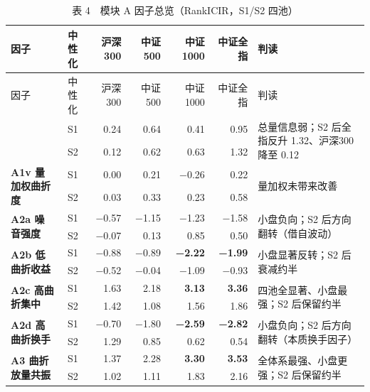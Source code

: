 \documentclass[UTF8,a4paper,zihao=-4,fontset=windows]{ctexart}
\begin{document}
\begin{longtable}{@{}p{3.0cm} c r r r r p{5.2cm}@{}}
\caption{表 4　模块 A 因子总览（RankICIR，S1/S2 四池）}\\
\toprule
因子 & 中性化 & 沪深300 & 中证500 & 中证1000 & 中证全指 & 判读 \\
\midrule
\endfirsthead
\toprule
因子 & 中性化 & 沪深300 & 中证500 & 中证1000 & 中证全指 & 判读 \\
\midrule
\endhead
\bottomrule
\endfoot
\multirow{2}{\hsize}{\textbf{A1 基础曲折度}} & S1 & 0.24 & 0.64 & 0.41 & 0.95 & \multirow{2}{\hsize}{总量信息弱；S2 后全指反升 1.32、沪深300 降至 0.12} \\
 & S2 & 0.12 & 0.62 & 0.63 & 1.32 & \\
\cmidrule(lr){2-6}
\multirow{2}{\hsize}{\textbf{A1v 量加权曲折度}} & S1 & 0.00 & 0.21 & −0.26 & 0.22 & \multirow{2}{\hsize}{量加权未带来改善} \\
 & S2 & 0.03 & 0.33 & 0.23 & 0.58 & \\
\cmidrule(lr){2-6}
\multirow{2}{\hsize}{\textbf{A2a 噪音强度}} & S1 & −0.57 & −1.15 & −1.23 & −1.58 & \multirow{2}{\hsize}{小盘负向；S2 后方向翻转（借自波动）} \\
 & S2 & −0.07 & 0.13 & 0.85 & 0.50 & \\
\cmidrule(lr){2-6}
\multirow{2}{\hsize}{\textbf{A2b 低曲折收益}} & S1 & −0.88 & −0.89 & \textbf{−2.22} & \textbf{−1.99} & \multirow{2}{\hsize}{小盘显著反转；S2 后衰减约半} \\
 & S2 & −0.52 & −0.04 & −1.09 & −0.93 & \\
\cmidrule(lr){2-6}
\multirow{2}{\hsize}{\textbf{A2c 高曲折集中}} & S1 & 1.63 & 2.18 & \textbf{3.13} & \textbf{3.36} & \multirow{2}{\hsize}{四池全显著、小盘最强；S2 后保留约半} \\
 & S2 & 1.42 & 1.08 & 1.56 & 1.86 & \\
\cmidrule(lr){2-6}
\multirow{2}{\hsize}{\textbf{A2d 高曲折换手}} & S1 & −0.70 & −1.80 & \textbf{−2.59} & \textbf{−2.82} & \multirow{2}{\hsize}{小盘负向；S2 后方向翻转（本质换手因子）} \\
 & S2 & 1.29 & 0.85 & 0.62 & 0.54 & \\
\cmidrule(lr){2-6}
\multirow{2}{\hsize}{\textbf{A3 曲折放量共振}} & S1 & 1.37 & 2.28 & \textbf{3.30} & \textbf{3.53} & \multirow{2}{\hsize}{全体系最强、小盘更强；S2 后保留约半} \\
 & S2 & 1.02 & 1.11 & 1.83 & 2.16 & \\
\end{longtable}
\end{document}
